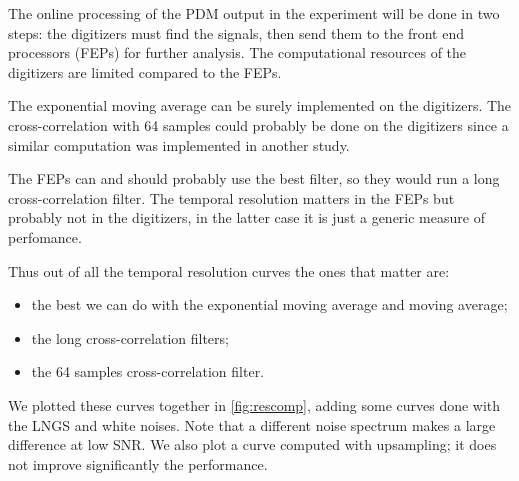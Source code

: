 The online processing of the PDM output in the experiment will be done in two
steps: the digitizers must find the signals, then send them to the front end
processors (FEPs) for further analysis. The computational resources of the
digitizers are limited compared to the FEPs.


The exponential moving average can be surely implemented on the digitizers. The
cross-correlation with 64 samples could probably be done on the digitizers
since a similar computation was implemented in another study.

The FEPs can and should probably use the best filter, so they would run a long
cross-correlation filter. The temporal resolution matters in the FEPs but
probably not in the digitizers, in the latter case it is just a generic measure
of perfomance.

Thus out of all the temporal resolution curves the ones that matter are:
%
\begin{itemize}
    \item the best we can do with the exponential moving average and moving
    average;
    \item the long cross-correlation filters;
    \item the 64 samples cross-correlation filter.
\end{itemize}
%
We plotted these curves together in \autoref{fig:rescomp}, adding some
curves done with the LNGS and white noises. Note that a different noise
spectrum makes a large difference at low SNR. We also plot a curve computed
with upsampling; it does not improve significantly the performance.


\begin{figure}
    

\end{figure}

